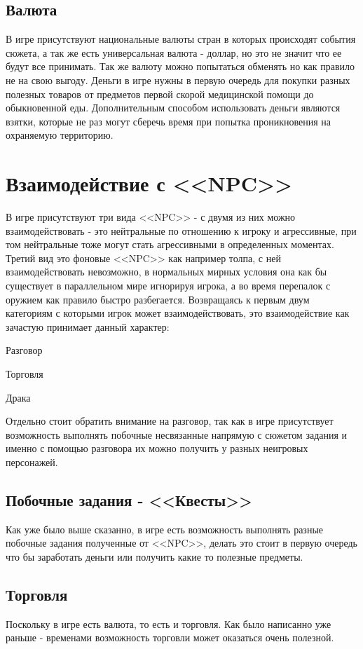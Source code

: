 \documentclass[11pt]{report}
\newenvironment{itemize*}%
  {\begin{itemize}%
    \setlength{\itemsep}{2pt}%
    \setlength{\parskip}{0.75pt}}%
  {\end{itemize}}
\begin{document}
\subsection{Валюта}
В игре присутствуют национальные валюты стран в которых происходят события сюжета, а так же есть универсальная валюта - доллар, но это не значит что ее будут все принимать. Так же валюту можно попытаться обменять но как правило не на свою выгоду. Деньги в игре нужны в первую очередь для покупки разных полезных товаров от предметов первой скорой медицинской помощи до обыкновенной еды. Дополнительным способом использовать деньги являются взятки, которые не раз могут сберечь время при попытка проникновения на охраняемую территорию.

\section{Взаимодействие с <<NPC>>}
В игре присутствуют три вида <<NPC>> - с двумя из них можно взаимодействовать - это нейтральные по отношению к игроку и агрессивные, при том нейтральные тоже могут стать агрессивными в определенных моментах. Третий вид это фоновые <<NPC>> как например толпа, с ней взаимодействовать невозможно, в нормальных мирных условия она как бы существует в параллельном мире игнорируя игрока, а во время перепалок с оружием как правило быстро разбегается. Возвращаясь к первым двум категориям с которыми игрок может взаимодействовать, это взаимодействие как зачастую принимает данный характер: 
\begin{itemize*}
\item Разговор
\item Торговля
\item Драка
\end{itemize*}
Отдельно стоит обратить внимание на разговор, так как в игре присутствует возможность выполнять побочные несвязанные напрямую с сюжетом задания и именно с помощью разговора их можно получить у разных неигровых персонажей.

\subsection{Побочные задания - <<Квесты>>}
Как уже было выше сказанно, в игре есть возможность выполнять разные побочные задания полученные от <<NPC>>, делать это стоит в первую очередь что бы заработать деньги или получить какие то полезные предметы.

\subsection{Торговля} 
Поскольку в игре есть валюта, то есть и торговля. Как было написанно уже раньше - временами возможность торговли может оказаться очень полезной.\\
\end{document}
